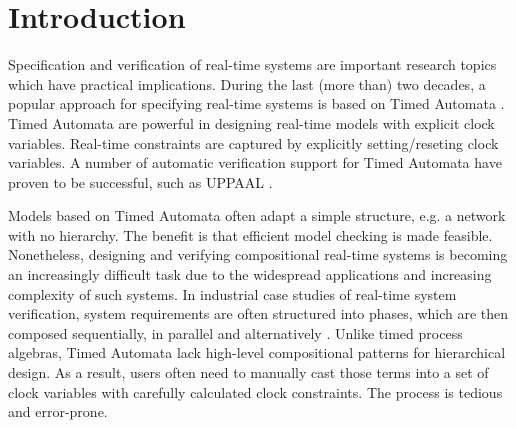 \documentclass[acmsmall,10pt,review]{acmart}
\begin{document}


  



\maketitle

\section{Introduction}
\label{Introduction}

Specification and verification of real-time systems are important 
research topics which have practical implications. During the last 
(more than) two decades, a popular approach for specifying real-time systems is 
based on Timed Automata \cite{DBLP:journals/tcs/AlurD94}. 
Timed Automata are powerful 
in designing real-time models with explicit clock variables. Real-time 
constraints are captured by explicitly setting/reseting clock variables. 
A number of automatic verification support for Timed Automata have proven 
to be successful, such as UPPAAL \cite{DBLP:journals/sttt/LarsenPY97}.


Models based on Timed Automata often adapt a simple structure, e.g. a 
network with no hierarchy. The benefit is that 
efficient model checking is made feasible. Nonetheless, designing and 
verifying compositional real-time systems is becoming an increasingly 
difficult task due to the widespread applications and increasing complexity 
of such systems. In industrial case studies of real-time system verification, system 
requirements are often structured into phases, which are then composed 
sequentially, in parallel and alternatively \cite{DBLP:conf/emsoft/LarsenMNS05}. 
Unlike timed process algebras, Timed Automata lack high-level 
compositional patterns for hierarchical design. As a result, users often 
need to manually cast those terms into a set of clock variables with 
carefully calculated clock constraints. The process is tedious and error-prone.
\end{document}
